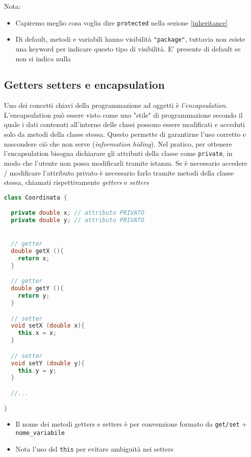 Nota:
\begin{itemize}
	\item Capiremo meglio cosa voglia dire \verb|protected| nella sezione \ref{inheritance}
	\item Di default, metodi e variabili hanno visibilità \verb|"package"|, tuttavia non esiste una keyword per indicare questo tipo di visibilità. E' presente di default se non si indica nulla
\end{itemize}

\subsection{Getters setters e encapsulation}
Uno dei concetti chiavi della programmazione ad oggetti è \textit{l'encapsulation}. L'encapsulation può essere visto come uno "stile" di programmazione secondo il quale i dati contenuti all'interno delle classi possono essere modificati e acceduti solo da metodi della classe stessa. Questo permette di garantirne l'uso corretto e nascondere ciò che non serve (\textit{information hiding}).
\vskip3mm
Nel pratico, per ottenere l'encapsulation bisogna dichiarare gli attributi della classe come \verb|private|, in modo che l'utente non possa modificarli tramite istanza.
\vskip3mm
Se è necessario accedere / modificare l'attributo privato è necessario farlo tramite metodi della classe stessa, chiamati rispettivamente \textit{getters} e \textit{setters}
\vskip3mm
\begin{lstlisting}[language = c++, frame = none]
class Coordinata {

  private double x; // attributo PRIVATO
  private double y; // attributo PRIVATO


  // getter
  double getX (){
    return x;
  }

  // getter
  double getY (){
    return y;
  }

  // setter
  void setX (double x){
    this.x = x;
  }

  // setter
  void setY (double y){
    this.y = y;
  }

  //...

}
\end{lstlisting}
\vskip3mm

\begin{itemize}
	\item Il nome dei metodi getters e setters è per convenzione formato da \verb|get/set| + \verb|nome_variabile|
	\item Nota l'uso del \verb|this| per evitare ambiguità nei setters
\end{itemize}

